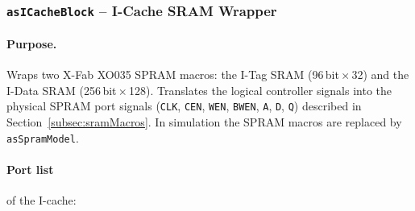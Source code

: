 \subsubsection{\texttt{asICacheBlock} -- I-Cache SRAM Wrapper}
\label{subsubsec:asICacheBlock}

\paragraph{Purpose.}
Wraps two X-Fab XO035 SPRAM macros: the I-Tag SRAM (96\,bit\,$\times$\,32)
and the I-Data SRAM (256\,bit\,$\times$\,128).
Translates the logical controller signals into the physical SPRAM port
signals (\texttt{CLK}, \texttt{CEN}, \texttt{WEN}, \texttt{BWEN},
\texttt{A}, \texttt{D}, \texttt{Q}) described in
Section~\ref{subsec:sramMacros}.
In simulation the SPRAM macros are replaced by \texttt{asSpramModel}.

\paragraph{Port list} of the I-cache:


